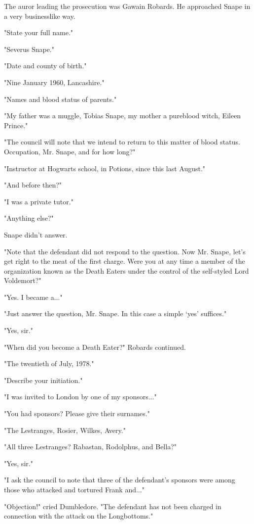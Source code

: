 \documentclass[a4paper,11pt]{article}
\begin{document}
The auror leading the prosecution was Gawain Robards. He approached Snape in a very businesslike way.

"State your full name."

"Severus Snape."

"Date and county of birth."

"Nine January 1960, Lancashire."

"Names and blood status of parents."

"My father was a muggle, Tobias Snape, my mother a pureblood witch, Eileen Prince."

"The council will note that we intend to return to this matter of blood status. Occupation, Mr. Snape, and for how long?"

"Instructor at Hogwarts school, in Potions, since this last August."

"And before then?"

"I was a private tutor."

"Anything else?"

Snape didn't answer.

"Note that the defendant did not respond to the question. Now Mr. Snape, let's get right to the meat of the first charge. Were you at any time a member of the organization known as the Death Eaters under the control of the self-styled Lord Voldemort?"

"Yes. I became a..."

"Just answer the question, Mr. Snape. In this case a simple `yes' suffices."

"Yes, sir."

"When did you become a Death Eater?" Robards continued.

"The twentieth of July, 1978."

"Describe your initiation."

"I was invited to London by one of my sponsors..."

"You had sponsors? Please give their surnames."

"The Lestranges, Rosier, Wilkes, Avery."

"All three Lestranges? Rabastan, Rodolphus, and Bella?"

"Yes, sir."

"I ask the council to note that three of the defendant's sponsors were among those who attacked and tortured Frank and..."

"Objection!" cried Dumbledore. "The defendant has not been charged in connection with the attack on the Longbottoms."
\end{document}
